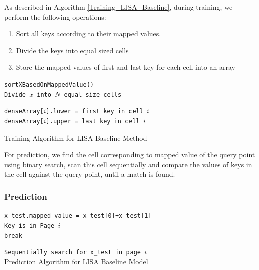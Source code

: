 As described in Algorithm \ref{Training_LISA_Baseline}, during training, we perform the following operations:

\begin{enumerate}
	\item Sort all keys according to their mapped values.
	\item Divide the keys into equal sized cells
	\item Store the mapped values of first and last key for each cell into an array
\end{enumerate}

\begin{algorithm}[H]
    \SetAlgoLined
     \texttt{sortXBasedOnMappedValue()}\\
     \texttt{Divide $x$ into $N$ equal size cells}\\
     {
         \texttt{denseArray[$i$].lower = first key in cell $i$  } \\
		 \texttt{denseArray[$i$].upper = last key in cell $i$  }
		
     }
     \caption{Training Algorithm for LISA Baseline Method}
     \label{Training_LISA_Baseline}
\end{algorithm}

For prediction, we find the cell corresponding to mapped value of the query point using binary search, scan this cell sequentially and compare the values of keys in the cell against the query point, until a match is found.

\subsubsection{Prediction}

\begin{algorithm}[H]
    \SetAlgoLined
    \texttt{x\_test.mapped\_value = x\_test[0]+x\_test[1] } \\
    {
        {
		    \texttt{Key is in Page $i$ } \\
		    \texttt{break }
		}
    }
  
 	 \texttt{Sequentially search for x\_test in page $i$} \\
     \caption{Prediction Algorithm for LISA Baseline Model }
\end{algorithm}


